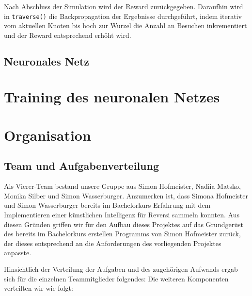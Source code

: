 \documentclass[12pt,a4paper]{article}
\begin{document}
Nach Abschluss der Simulation wird der Reward zurückgegeben. Daraufhin wird in \texttt{traverse()} die Backpropagation der Ergebnisse durchgeführt, indem iterativ vom aktuellen Knoten bis hoch zur Wurzel die Anzahl an Besuchen inkrementiert und der Reward entsprechend erhöht wird.

\subsection{Neuronales Netz}

\newpage


\section{Training des neuronalen Netzes}



\newpage

\section{Organisation}

\subsection{Team und Aufgabenverteilung}
Als Vierer-Team bestand unsere Gruppe aus Simon Hofmeister, Nadiia Matsko, Monika Silber und Simon Wasserburger. Anzumerken ist, dass Simona Hofmeister und Simon Wasserburger bereits im Bachelorkurs Erfahrung mit dem Implementieren einer künstlichen Intelligenz für Reversi sammeln konnten. Aus diesen Gründen griffen wir für den Aufbau dieses Projektes auf das Grundgerüst des bereits im Bachelorkurs erstellen Programms von Simon Hofmeister zurück, der dieses entsprechend an die Anforderungen des vorliegenden Projektes anpasste.

Hinsichtlich der Verteilung der Aufgaben und des zugehörigen Aufwands ergab sich für die einzelnen Teammitglieder folgendes:
Die weiteren Komponenten verteilten wir wie folgt:
\end{document}
